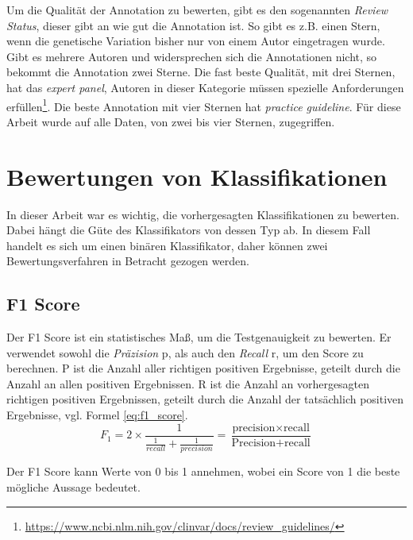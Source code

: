 Um die Qualität der Annotation zu bewerten, gibt es den sogenannten \emph{Review Status}, dieser gibt an wie gut die Annotation ist. So gibt es z.B. einen Stern, wenn die genetische Variation bisher nur von einem Autor eingetragen wurde. Gibt es mehrere Autoren und widersprechen sich die Annotationen nicht, so bekommt die Annotation zwei Sterne. Die fast beste Qualität, mit drei Sternen, hat das \emph{expert panel}, Autoren in dieser Kategorie müssen spezielle Anforderungen erfüllen\footnote{\url{https://www.ncbi.nlm.nih.gov/clinvar/docs/review_guidelines/}}. Die beste Annotation mit vier Sternen hat \emph{practice guideline}. Für diese Arbeit wurde auf alle Daten, von zwei bis vier Sternen, zugegriffen.



\section{Bewertungen von Klassifikationen}
In dieser Arbeit war es wichtig, die vorhergesagten Klassifikationen zu bewerten. Dabei hängt die Güte des Klassifikators von dessen Typ ab. In diesem Fall handelt es sich um einen binären Klassifikator, daher können zwei Bewertungsverfahren in Betracht gezogen werden.

\subsection{F1 Score}
Der F1 Score ist ein statistisches Maß, um die Testgenauigkeit zu bewerten. Er verwendet sowohl die \emph{Präzision} p, als auch den \emph{Recall} r, um den Score zu berechnen. P ist die Anzahl aller richtigen positiven Ergebnisse, geteilt durch die Anzahl an allen positiven Ergebnissen. R ist die Anzahl an vorhergesagten richtigen positiven Ergebnissen, geteilt durch die Anzahl der tatsächlich positiven Ergebnisse, vgl. Formel \ref{eq:f1_score}.
\begin{equation}
    F_{1} = 2 \times \frac{1}{\frac{1}{recall}+\frac{1}{precision}} = \frac{\text{precision} \times \text{recall}}{\text{Precision} + \text{recall}}
    \label{eq:f1_score}
\end{equation}

Der F1 Score kann Werte von 0 bis 1 annehmen, wobei ein Score von 1 die beste mögliche Aussage bedeutet.


